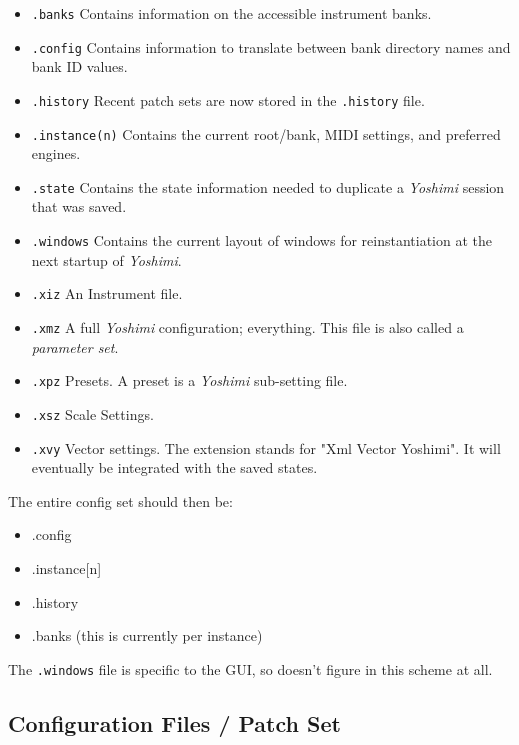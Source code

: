    \begin{itemize}
      \item \texttt{.banks}
         Contains information on the accessible instrument banks.
      \item \texttt{.config}
         Contains information to translate between bank directory names and
         bank ID values.
      \item \texttt{.history}
         Recent patch sets are now stored in the \texttt{.history} file.
      \item \texttt{.instance(n)}
         Contains the current root/bank, MIDI settings, and preferred engines.
      \item \texttt{.state}
         Contains the state information needed to
         duplicate a \textsl{Yoshimi} session that was saved.
      \item \texttt{.windows}
         Contains the current layout of windows for reinstantiation at the next
         startup of \textsl{Yoshimi}.
      \item \texttt{.xiz}
         An Instrument file.
      \item \texttt{.xmz}
         A full \textsl{Yoshimi} configuration; everything.
         This file is also called a \textsl{parameter set}.
      \item \texttt{.xpz}
         Presets.
         A preset is a \textsl{Yoshimi} sub-setting file.
      \item \texttt{.xsz}
         Scale Settings.
      \item \texttt{.xvy}
         Vector settings. The extension stands for "Xml Vector Yoshimi".
         It will eventually be integrated with the saved states.
   \end{itemize}

   The entire config set should then be:

   \begin{itemize}
      \item .config
      \item .instance[n]
      \item .history
      \item .banks (this is currently per instance)
   \end{itemize}

   The \texttt{.windows} file is specific to the GUI, so doesn't figure in this
   scheme at all.

\subsection{Configuration Files / Patch Set}
\label{subsec:configuration_patch_set}

